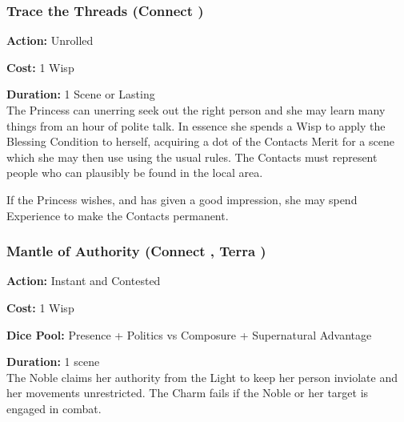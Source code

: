 \subsubsection*{Trace the Threads (Connect \textbullet)}

\noindent \textbf{Action:} Unrolled

\noindent \textbf{Cost:} 1 Wisp

\noindent \textbf{Duration:} 1 Scene or Lasting \\

\noindent The Princess can unerring seek out the right person and she may learn many things from an hour of polite talk. In essence she spends a Wisp to apply the Blessing Condition to herself, acquiring a dot of the Contacts Merit for a scene which she may then use using the usual rules. The Contacts must represent people who can plausibly be found in the local area.

If the Princess wishes, and has given a good impression, she may spend Experience to make the Contacts permanent.

\subsubsection*{Mantle of Authority (Connect \textbullet, Terra \textbullet)}

\noindent \textbf{Action:} Instant and Contested

\noindent \textbf{Cost:} 1 Wisp

\noindent \textbf{Dice Pool:} Presence + Politics vs Composure + Supernatural Advantage

\noindent \textbf{Duration:} 1 scene \\

\noindent The Noble claims her authority from the Light to keep her person inviolate and her movements unrestricted. The Charm fails if the Noble or her target is engaged in combat.

